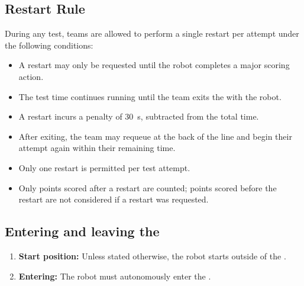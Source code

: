 \subsection{Restart Rule}\label{rule:restart}

During any test, teams are allowed to perform a single restart per attempt under the following conditions:
\begin{itemize}
    \item A restart may only be requested until the robot completes a major scoring action.
    \item The test time continues running until the team exits the \Arena{} with the robot.
    \item A restart incurs a penalty of \SI{30}{\second}, subtracted from the total time.
    \item After exiting, the team may requeue at the back of the line and begin their attempt again within their remaining time.
    \item Only one restart is permitted per test attempt.
    \item Only points scored after a restart are counted; points scored before the restart are not considered if a restart was requested.
\end{itemize}


\subsection{Entering and leaving the \Arena{}}\label{rule:start_position}
\begin{enumerate}

	\item \textbf{Start position:} Unless stated otherwise, the robot starts outside of the \Arena{}.
	\item \textbf{Entering:} The robot must autonomously enter the \Arena{}.
\end{enumerate}




